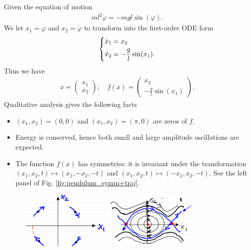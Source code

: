 \begin{ex}[Pendulum]
Given the equation of motion
\begin{align}
	ml^2 \ddot{\varphi} = -mgl \sin(\varphi).
\end{align}
We let $ x_1 = \varphi$ and $ {x}_2 =\dot{\varphi}$ to transform into the first-order ODE form
\begin{align}
	\begin{dcases}
	\dot{x}_1 = x_2 \\
\dot{x}_2 = - \frac{g}{l} \sin (x_1).
	\end{dcases}
\end{align}
Thus we have 
\begin{align}
 {x} = 
\begin{pmatrix}
	x_1 \\ x_2
\end{pmatrix}; \quad
f( {x}) = 
\begin{pmatrix}
	x_2 \\ - \frac{g}{l}\sin(x_1)	
\end{pmatrix}.
\end{align}
Qualitative analysis gives the following facts
\begin{itemize}
	\item $(x_1, x_2) = (0,0)$ and $(x_1, x_2) = (\pi , 0)$ are zeros of $f$.
	\item Energy is conserved, hence both small and large amplitude oscillations are expected.
	\item The function $f(x)$ has symmetries: it is invariant under the transformation $(x_1, x_2, t) \mapsto (x_1, -x_2, -t)$ and $(x_1, x_2, t) \mapsto (-x_1, x_2, -t)$. See the left panel of Fig. \ref{fig:pendulum_symm+traj}.
\end{itemize}
\begin{figure}[h!]
	\centering
	\includegraphics[width=0.4\textwidth]{figures/intro/6pendulum_symmetries.png}
	\hspace{0.05\textwidth}
	\includegraphics[width=0.4\textwidth]{figures/intro/5pendulum.png}

\end{figure}
\end{ex}
